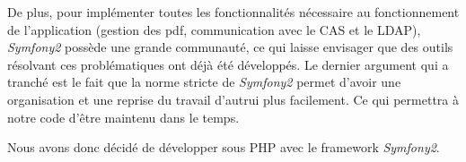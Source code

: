 De plus, pour implémenter toutes les fonctionnalités nécessaire au fonctionnement de l'application (gestion des pdf, communication avec le CAS et le LDAP), \textit{Symfony2} possède une grande communauté, ce qui laisse envisager que des outils résolvant ces problématiques ont déjà été développés.
Le dernier argument qui a tranché est le fait que la norme stricte de \textit{Symfony2} permet d'avoir une organisation et une reprise du travail d'autrui plus facilement. Ce qui permettra à notre code d'être maintenu dans le temps.

Nous avons donc décidé de développer sous PHP avec le framework \textit{Symfony2}.